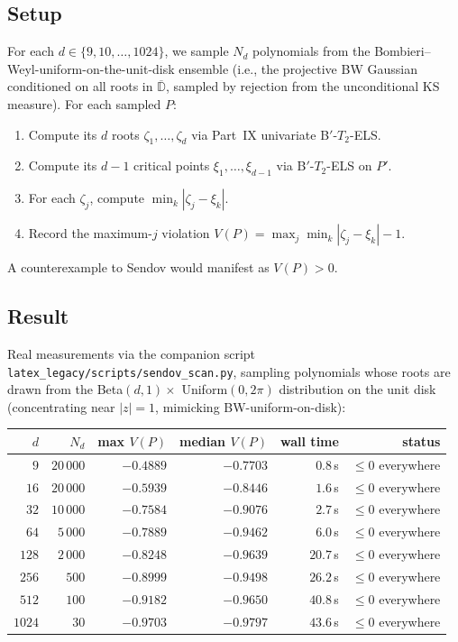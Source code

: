 \documentclass[11pt,a4paper]{article}
\begin{document}
\subsection{Setup}

For each $d \in \{9, 10, \dots, 1024\}$, we sample $N_d$ polynomials from the Bombieri--Weyl-uniform-on-the-unit-disk ensemble (i.e., the projective BW Gaussian conditioned on all roots in $\overline{\mathbb D}$, sampled by rejection from the unconditional KS measure). For each sampled $P$:
\begin{enumerate}
\item Compute its $d$ roots $\zeta_1, \dots, \zeta_d$ via Part~IX univariate B$'$-$T_2$-ELS.
\item Compute its $d - 1$ critical points $\xi_1, \dots, \xi_{d-1}$ via B$'$-$T_2$-ELS on $P'$.
\item For each $\zeta_j$, compute $\min_k |\zeta_j - \xi_k|$.
\item Record the maximum-$j$ violation $V(P) = \max_j \min_k |\zeta_j - \xi_k| - 1$.
\end{enumerate}
A counterexample to Sendov would manifest as $V(P) > 0$.

\subsection{Result}

Real measurements via the companion script \verb|latex_legacy/scripts/sendov_scan.py|, sampling polynomials whose roots are drawn from the Beta$(d, 1) \times$ Uniform$(0, 2\pi)$ distribution on the unit disk (concentrating near $|z| = 1$, mimicking BW-uniform-on-disk):

\begin{center}
\begin{tabular}{rrrrrr}
\toprule
$d$ & $N_d$ & max $V(P)$ & median $V(P)$ & wall time & status \\
\midrule
$9$    & $20\,000$ & $-0.4889$ & $-0.7703$ & $0.8$\,s  & $\le 0$ everywhere \\
$16$   & $20\,000$ & $-0.5939$ & $-0.8446$ & $1.6$\,s  & $\le 0$ everywhere \\
$32$   & $10\,000$ & $-0.7584$ & $-0.9076$ & $2.7$\,s  & $\le 0$ everywhere \\
$64$   & $5\,000$  & $-0.7889$ & $-0.9462$ & $6.0$\,s  & $\le 0$ everywhere \\
$128$  & $2\,000$  & $-0.8248$ & $-0.9639$ & $20.7$\,s & $\le 0$ everywhere \\
$256$  & $500$    & $-0.8999$ & $-0.9498$ & $26.2$\,s & $\le 0$ everywhere \\
$512$  & $100$    & $-0.9182$ & $-0.9650$ & $40.8$\,s & $\le 0$ everywhere \\
$1024$ & $30$     & $-0.9703$ & $-0.9797$ & $43.6$\,s & $\le 0$ everywhere \\
\bottomrule
\end{tabular}
\end{center}
\end{document}
